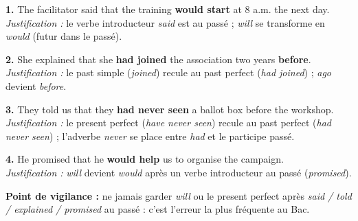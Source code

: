\documentclass[11pt]{article}
\begin{document}
\begin{corrige}

\textbf{1.} The facilitator said that the training \textbf{would start} at 8 a.m. the next day.\\
\emph{Justification :} le verbe introducteur \emph{said} est au passé ; \emph{will} se transforme en \emph{would} (futur dans le passé).

\textbf{2.} She explained that she \textbf{had joined} the association two years \textbf{before}.\\
\emph{Justification :} le past simple (\emph{joined}) recule au past perfect (\emph{had joined}) ; \emph{ago} devient \emph{before}.

\textbf{3.} They told us that they \textbf{had never seen} a ballot box before the workshop.\\
\emph{Justification :} le present perfect (\emph{have never seen}) recule au past perfect (\emph{had never seen}) ; l'adverbe \emph{never} se place entre \emph{had} et le participe passé.

\textbf{4.} He promised that he \textbf{would help} us to organise the campaign.\\
\emph{Justification :} \emph{will} devient \emph{would} après un verbe introducteur au passé (\emph{promised}).

\textbf{Point de vigilance :} ne jamais garder \emph{will} ou le present perfect après \emph{said / told / explained / promised} au passé : c'est l'erreur la plus fréquente au Bac.
\end{corrige}
\end{document}
